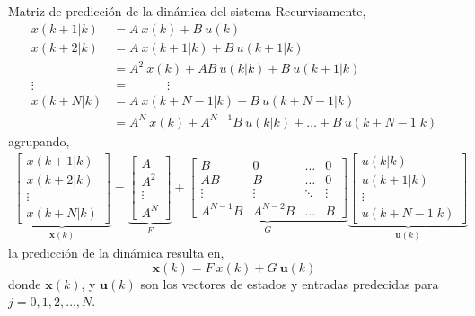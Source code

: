 \documentclass[8pt]{beamer}
\begin{document}
\begin{frame}[fragile]{Matriz de predicción de la dinámica del sistema}	
	Recurvisamente,
	\begin{align*}
	x(k+1|k) &= A~x(k)+B~u(k) \\
	x(k+2|k) &= A~x(k+1|k)+B~u(k+1|k) \\
	&= A^2~x(k)+AB~u(k|k)+B~u(k+1|k) \\
	\vdots \hspace{2em}  &= \hspace{3em} \vdots \\
	x(k+N|k) &= A~x(k+N-1|k)+B~u(k+N-1|k) \\
	&= A^N~x(k)+A^{N-1}B~u(k|k)+\dots+B~u(k+N-1|k)
	\end{align*}
	agrupando,
	\begin{equation}
	\begin{aligned}
	{\underbrace{
			\begin{bmatrix}
			x(k+1|k) \\
			x(k+2|k) \\
			\vdots \\
			x(k+N|k)
			\end{bmatrix}}_{\mathbf{x}(k)}
	}
	=
	{\underbrace{
			\begin{bmatrix}
			A \\
			A^2 \\
			\vdots \\
			A^N
			\end{bmatrix}}_{F}
	}
	+
	{\underbrace{
			\begin{bmatrix}
			B        & 0        & \dots  & 0      \\
			AB       & B        & \dots  & 0      \\
			\vdots   & \vdots   & \ddots & \vdots \\
			A^{N-1}B & A^{N-2}B & \dots  & B
			\end{bmatrix}}_{G}
	}
	{\underbrace{
			\begin{bmatrix}
			u(k|k) \\
			u(k+1|k) \\
			\vdots \\
			u(k+N-1|k)
			\end{bmatrix}}_{\mathbf{u}(k)}
	}
	\end{aligned}
	\end{equation}
	la predicción de la dinámica resulta en,
	\begin{equation}\label{eq:PredictionEqConstraint}
	\mathbf{x}(k) = F~x(k)+G~\mathbf{u}(k)
	\end{equation}
	donde $\mathbf{x}(k)$, y $\mathbf{u}(k)$ son los vectores de estados y entradas predecidas para $j=0,1,2,\dots,N$.
\end{frame}
\end{document}
